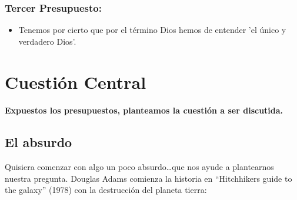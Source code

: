 \documentclass[10pt]{article}
\begin{document}
\subsubsection{Tercer Presupuesto:}
\begin{itemize}
\item Tenemos por cierto que por el término Dios hemos de entender 'el único y
  verdadero Dios'.
\end{itemize}

\section{Cuestión Central}
       \paragraph{Expuestos los presupuestos, planteamos la cuestión a ser
         discutida.}

         \subsection{El absurdo}
         Quisiera comenzar con algo un poco absurdo\ldots que nos ayude a
         plantearnos nuestra pregunta. Douglas Adams comienza la historia en ``Hitchhikers guide
         to the galaxy'' (1978) con la destrucción del planeta tierra:
\end{document}
